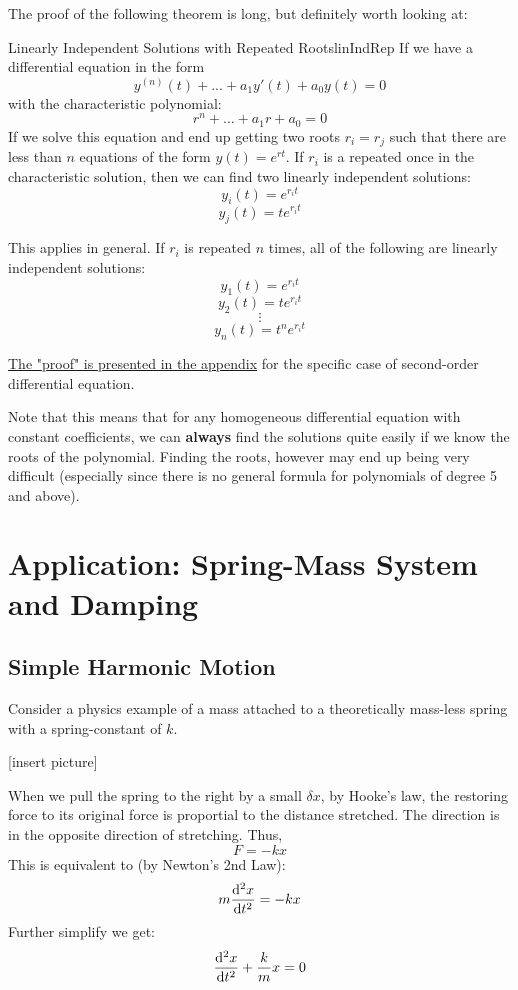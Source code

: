 \documentclass{report}
\begin{document}
The proof of the following theorem is long, but definitely worth looking at:


\begin{mytheo}{Linearly Independent Solutions with Repeated Roots}{linIndRep}
    If we have a differential equation in the form 
    $$y^{(n)}(t) + ... + a_1y'(t) + a_0y(t) = 0$$
    with the characteristic polynomial:
    $$r^n+\dots+a_1r+a_0=0$$
    If we solve this equation and end up getting two roots $r_i=r_j$ such that there are less than $n$ equations of the form $y(t) = e^{rt}$. 
    If $r_i$ is a repeated once in the characteristic solution, then we can find two linearly independent solutions:
    $$y_i(t) = e^{r_it}$$
    $$y_j(t) = te^{r_it}$$
    
    This applies in general. If $r_i$ is repeated $n$ times, all of the following are linearly independent solutions:
    $$y_1(t) = e^{r_it}$$
    $$y_2(t) = te^{r_it}$$
    $$\vdots$$
    $$y_n(t) = t^ne^{r_it}$$
\end{mytheo}

\label{repRoot}
\hyperref[sec:PrRepRoot]{The "proof" is presented in the appendix} for the specific case of second-order differential equation. 

Note that this means that for any homogeneous differential equation with constant coefficients, we can \textbf{always} find the solutions quite easily if we know the roots of the polynomial. Finding the roots, however may end up being very difficult (especially since there is no general formula for polynomials of degree 5 and above).


\section{Application: Spring-Mass System and Damping}
\subsection{Simple Harmonic Motion}
Consider a physics example of a mass attached to a theoretically mass-less spring with a spring-constant of $k$.

[insert picture]

When we pull the spring to the right by a small $\delta x$, by Hooke's law, the restoring force to its original force is proportial to the distance stretched. The direction is in the opposite direction of stretching. Thus,
$$F = -kx$$
This is equivalent to (by Newton's 2nd Law):
$$m\dv[2]{x}{t} = -kx$$
Further simplify we get:
$$\dv[2]{x}{t} + \frac{k}{m}x = 0$$
\end{document}
